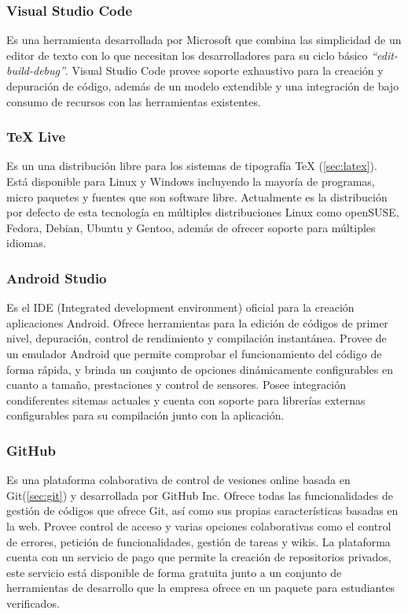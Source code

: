 \documentclass[12pt]{article}
\begin{document}
        \subsubsection{Visual Studio Code}
            Es una herramienta desarrollada por Microsoft que combina las simplicidad de un editor de texto con lo que necesitan los desarrolladores para su ciclo básico \textit{``edit-build-debug''}. Visual Studio Code provee soporte exhaustivo para la creación y depuración de código, además de un modelo extendible y una integración de bajo consumo de recursos con las herramientas existentes.

        \subsubsection{TeX Live}
            Es un una distribución libre para los sistemas de tipografía TeX (\ref{sec:latex}). Está disponible para Linux y Windows incluyendo la mayoría de programas, micro paquetes y fuentes que son software libre. Actualmente es la distribución por defecto de esta tecnología en múltiples distribuciones Linux como openSUSE, Fedora, Debian, Ubuntu y Gentoo, además de ofrecer soporte para múltiples idiomas.

        \subsubsection{Android Studio}
            Es el IDE (Integrated development environment) oficial para la creación aplicaciones Android. Ofrece herramientas para la edición de códigos de primer nivel, depuración, control de rendimiento y compilación instantánea. Provee de un emulador Android que permite comprobar el funcionamiento del código de forma rápida, y brinda un conjunto de opciones dinámicamente configurables en cuanto a tamaño, prestaciones y control de sensores. Posee integración condiferentes sitemas actuales y cuenta con soporte para librerías externas configurables para su compilación junto con la aplicación.

        \subsubsection{GitHub}
            Es una plataforma colaborativa de control de vesiones online basada en Git(\ref{sec:git}) y desarrollada por GitHub Inc. Ofrece todas las funcionalidades de gestión de códigos que ofrece Git, así como sus propias características basadas en la web. Provee control de acceso y varias opciones colaborativas como el control de errores, petición de funcionalidades, gestión de tareas y wikis. La plataforma cuenta con un servicio de pago que permite la creación de repositorios privados, este servicio está disponible de forma gratuita junto a un conjunto de herramientas de desarrollo que la empresa ofrece en un paquete para estudiantes verificados.
\end{document}
